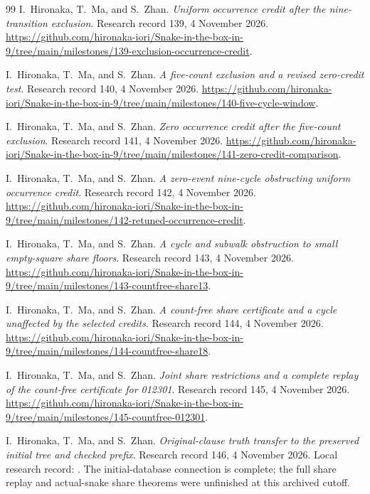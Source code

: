 \documentclass[11pt,a4paper]{article}
\theoremstyle{definition}
\theoremstyle{remark}
\begin{document}
\begin{thebibliography}{99}
I.~Hironaka, T.~Ma, and S.~Zhan. \emph{Uniform occurrence credit after the nine-transition exclusion}. Research record 139, 4 November 2026.
\url{https://github.com/hironaka-iori/Snake-in-the-box-in-9/tree/main/milestones/139-exclusion-occurrence-credit}.

I.~Hironaka, T.~Ma, and S.~Zhan. \emph{A five-count exclusion and a revised zero-credit test}. Research record 140, 4 November 2026.
\url{https://github.com/hironaka-iori/Snake-in-the-box-in-9/tree/main/milestones/140-five-cycle-window}.

I.~Hironaka, T.~Ma, and S.~Zhan. \emph{Zero occurrence credit after the five-count exclusion}. Research record 141, 4 November 2026.
\url{https://github.com/hironaka-iori/Snake-in-the-box-in-9/tree/main/milestones/141-zero-credit-comparison}.

I.~Hironaka, T.~Ma, and S.~Zhan. \emph{A zero-event nine-cycle obstructing uniform occurrence credit}. Research record 142, 4 November 2026.
\url{https://github.com/hironaka-iori/Snake-in-the-box-in-9/tree/main/milestones/142-retuned-occurrence-credit}.

I.~Hironaka, T.~Ma, and S.~Zhan. \emph{A cycle and subwalk obstruction to small empty-square share floors}. Research record 143, 4 November 2026.
\url{https://github.com/hironaka-iori/Snake-in-the-box-in-9/tree/main/milestones/143-countfree-share13}.

I.~Hironaka, T.~Ma, and S.~Zhan. \emph{A count-free share certificate and a cycle unaffected by the selected credits}. Research record 144, 4 November 2026.
\url{https://github.com/hironaka-iori/Snake-in-the-box-in-9/tree/main/milestones/144-countfree-share18}.

I.~Hironaka, T.~Ma, and S.~Zhan. \emph{Joint share restrictions and a complete replay of the count-free certificate for 012301}. Research record 145, 4 November 2026.
\url{https://github.com/hironaka-iori/Snake-in-the-box-in-9/tree/main/milestones/145-countfree-012301}.

I.~Hironaka, T.~Ma, and S.~Zhan. \emph{Original-clause truth transfer to the
preserved initial tree and checked prefix}. Research record 146,
4 November 2026. Local research record:
.
The initial-database connection is complete; the full share replay and
actual-snake share theorems were unfinished at this archived cutoff.


\end{thebibliography}
\end{document}
